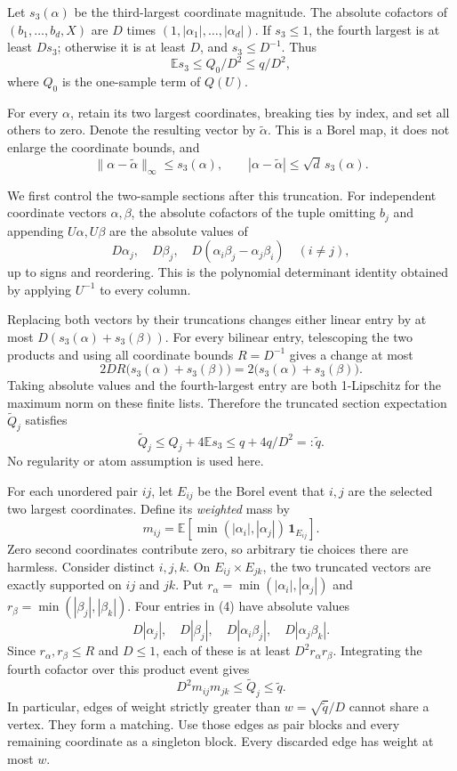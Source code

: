 \documentclass[
  11pt,
]{article}
\begin{document}
Let \(s_3(\alpha)\) be the third-largest coordinate magnitude. The
absolute cofactors of \((b_1,\ldots,b_d,X)\) are \(D\) times
\((1,|\alpha_1|,\ldots,|\alpha_d|)\). If \(s_3\le1\), the fourth largest
is at least \(Ds_3\); otherwise it is at least \(D\), and
\(s_3\le D^{-1}\). Thus \[
 \mathbb Es_3\le Q_0/D^2\le q/D^2,                           \tag{2}
\] where \(Q_0\) is the one-sample term of \(Q(U)\).

For every \(\alpha\), retain its two largest coordinates, breaking ties
by index, and set all others to zero. Denote the resulting vector by
\(\widetilde\alpha\). This is a Borel map, it does not enlarge the
coordinate bounds, and \[
 \|\alpha-\widetilde\alpha\|_\infty\le s_3(\alpha),
 \qquad |\alpha-\widetilde\alpha|\le\sqrt d\,s_3(\alpha).    \tag{3}
\]

We first control the two-sample sections after this truncation. For
independent coordinate vectors \(\alpha,\beta\), the absolute cofactors
of the tuple omitting \(b_j\) and appending \(U\alpha,U\beta\) are the
absolute values of \[
 D\alpha_j,\quad D\beta_j,\quad
 D(\alpha_i\beta_j-\alpha_j\beta_i)\quad(i\ne j),             \tag{4}
\] up to signs and reordering. This is the polynomial determinant
identity obtained by applying \(U^{-1}\) to every column.

Replacing both vectors by their truncations changes either linear entry
by at most \(D(s_3(\alpha)+s_3(\beta))\). For every bilinear entry,
telescoping the two products and using all coordinate bounds
\(R=D^{-1}\) gives a change at most \[
 2DR\bigl(s_3(\alpha)+s_3(\beta)\bigr)
 =2\bigl(s_3(\alpha)+s_3(\beta)\bigr).
\] Taking absolute values and the fourth-largest entry are both
1-Lipschitz for the maximum norm on these finite lists. Therefore the
truncated section expectation \(\widetilde Q_j\) satisfies \[
 \widetilde Q_j\le Q_j+4\mathbb Es_3
 \le q+4q/D^2=:\widetilde q.                                \tag{5}
\] No regularity or atom assumption is used here.

For each unordered pair \(ij\), let \(E_{ij}\) be the Borel event that
\(i,j\) are the selected two largest coordinates. Define its
\emph{weighted} mass by \[
 m_{ij}=\mathbb E\left[
   \min(|\alpha_i|,|\alpha_j|)\,\mathbf1_{E_{ij}}\right].     \tag{6}
\] Zero second coordinates contribute zero, so arbitrary tie choices
there are harmless. Consider distinct \(i,j,k\). On
\(E_{ij}\times E_{jk}\), the two truncated vectors are exactly supported
on \(ij\) and \(jk\). Put \(r_\alpha=\min(|\alpha_i|,|\alpha_j|)\) and
\(r_\beta=\min(|\beta_j|,|\beta_k|)\). Four entries in (4) have absolute
values \[
 D|\alpha_j|,\quad D|\beta_j|,\quad
 D|\alpha_i\beta_j|,\quad D|\alpha_j\beta_k|.
\] Since \(r_\alpha,r_\beta\le R\) and \(D\le1\), each of these is at
least \(D^2r_\alpha r_\beta\). Integrating the fourth cofactor over this
product event gives \[
 D^2m_{ij}m_{jk}\le\widetilde Q_j\le\widetilde q.           \tag{7}
\] In particular, edges of weight strictly greater than
\(w=\sqrt{\widetilde q}/D\) cannot share a vertex. They form a matching.
Use those edges as pair blocks and every remaining coordinate as a
singleton block. Every discarded edge has weight at most \(w\).
\end{document}
